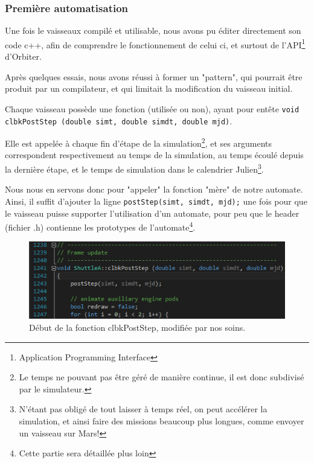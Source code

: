 \documentclass[a4paper,11pt]{article}
\begin{document}

    \subsubsection{Première automatisation}
        Une fois le vaisseaux compilé et utilisable, nous avons pu éditer directement son code c++, afin de comprendre le fonctionnement de celui ci, et surtout de l'API\footnote{Application Programming Interface} d'Orbiter.

        Après quelques essais, nous avons réussi à former un "pattern", qui pourrait être produit par un compilateur, et qui limitait la modification du vaisseau initial.
        
        Chaque vaisseau possède une fonction (utilisée ou non), ayant pour entête \texttt{void clbkPostStep (double simt, double simdt, double mjd)}. 
        
        Elle est appelée à chaque fin d'étape de la simulation\footnote{Le temps ne pouvant pas être géré de manière continue, il est donc subdivisé par le simulateur.}, et ses arguments correspondent respectivement au temps de la simulation, au temps écoulé depuis la dernière étape, et le temps de simulation dans le calendrier Julien\footnote{N'étant pas obligé de tout laisser à temps réel, on peut accélérer la simulation, et ainsi faire des missions beaucoup plus longues, comme envoyer un vaisseau sur Mars!}.
        
        Nous nous en servons donc pour "appeler" la fonction "mère" de notre automate. Ainsi, il suffit d'ajouter la ligne \texttt{postStep(simt, simdt, mjd);} une fois pour que le vaisseau puisse supporter l'utilisation d'un automate, pour peu que le header (fichier .h) contienne les prototypes de l'automate\footnote{Cette partie sera détaillée plus loin}.
        
        \begin{figure}[!h]
            \begin{center}
                \includegraphics{img/post_step.png}
                \caption{Début de la fonction clbkPostStep, modifiée par nos soins.}
            \end{center}
        \end{figure}
        
\end{document}
